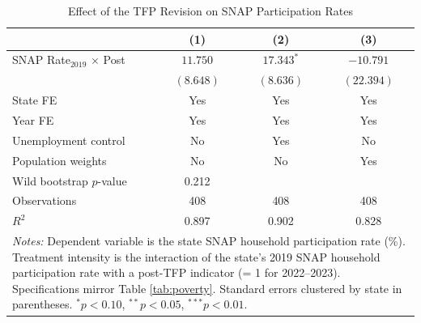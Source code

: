 \begin{table}[htbp]
\centering
\caption{Effect of the TFP Revision on SNAP Participation Rates}
\label{tab:snap}
\begin{tabular}{lccc}
\hline\hline
 & (1) & (2) & (3) \\
\hline
SNAP Rate$_{2019}$ $\times$ Post & $11.750$ & $17.343^{*}$ & $-10.791$ \\
 & $(8.648)$ & $(8.636)$ & $(22.394)$ \\
\hline
State FE & Yes & Yes & Yes \\
Year FE & Yes & Yes & Yes \\
Unemployment control & No & Yes & No \\
Population weights & No & No & Yes \\
Wild bootstrap $p$-value & 0.212 & & \\
\hline
Observations & 408 & 408 & 408 \\
$R^2$ & 0.897 & 0.902 & 0.828 \\
\hline\hline
\multicolumn{4}{p{0.85\textwidth}}{\footnotesize \textit{Notes:} Dependent variable is the state SNAP household participation rate (\%). Treatment intensity is the interaction of the state's 2019 SNAP household participation rate with a post-TFP indicator (= 1 for 2022--2023). Specifications mirror Table \ref{tab:poverty}. Standard errors clustered by state in parentheses. $^{*}p<0.10$, $^{**}p<0.05$, $^{***}p<0.01$.} \\
\end{tabular}
\end{table}

